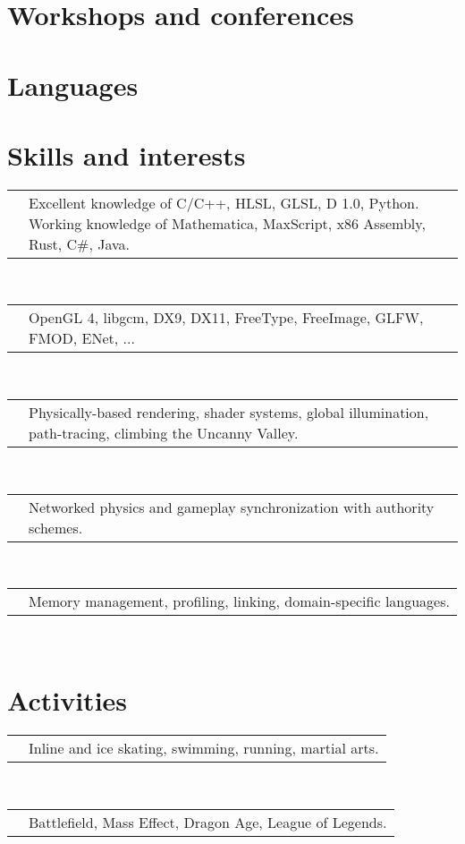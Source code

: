 \documentclass[11pt,a4paper]{moderncv}
\makeatletter
\newcommand\novspace{\@minipagetrue}
\renewcommand*{\cvline}[3][.25em]{%
  \begin{tabular}{@{}p{\hintscolumnwidth}@{\hspace{\separatorcolumnwidth}}p{\maincolumnwidth}@{}}%
 	  \raggedleft\hintfont{#2} &{\novspace #3}%
  \end{tabular}\\[#1]}
\makeatother
\begin{document}
\section{Workshops and conferences}
%
%
%

\section{Languages}

\section{Skills and interests}
\cvline{Programming}{Excellent knowledge of C/C++, HLSL, GLSL, D 1.0, Python.\newline{}
Working knowledge of Mathematica, MaxScript, x86 Assembly, Rust, C\#, Java.}
\cvline{API}{OpenGL 4, libgcm, DX9, DX11, FreeType, FreeImage, GLFW, FMOD, ENet, ...}
\cvline{Graphics}{Physically-based rendering, shader systems, global illumination, path-tracing, climbing the Uncanny Valley.}
\cvline{Networking}{Networked physics and gameplay synchronization with authority schemes.}
\cvline{Misc}{Memory management, profiling, linking, domain-specific languages.}

\section{Activities}
\cvline{Sports}{Inline and ice skating, swimming, running, martial arts.}
\cvline{Games}{Battlefield, Mass Effect, Dragon Age, League of Legends.}

\end{document}
